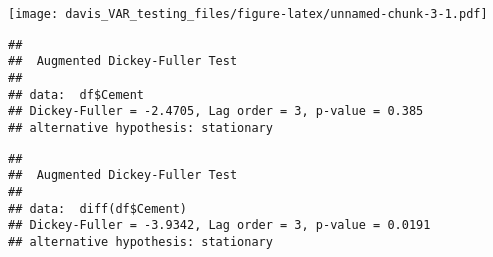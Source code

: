 \documentclass[
]{article}
\newenvironment{Shaded}{\begin{snugshade}}{\end{snugshade}}
\newcommand{\AttributeTok}[1]{\textcolor[rgb]{0.13,0.29,0.53}{#1}}
\newcommand{\CommentTok}[1]{\textcolor[rgb]{0.56,0.35,0.01}{\textit{#1}}}
\newcommand{\DecValTok}[1]{\textcolor[rgb]{0.00,0.00,0.81}{#1}}
\newcommand{\FunctionTok}[1]{\textcolor[rgb]{0.13,0.29,0.53}{\textbf{#1}}}
\newcommand{\NormalTok}[1]{#1}
\newcommand{\SpecialCharTok}[1]{\textcolor[rgb]{0.81,0.36,0.00}{\textbf{#1}}}
\begin{document}
\begin{Shaded}
\end{Shaded}

\texttt{[image: davis\_VAR\_testing\_files/figure-latex/unnamed-chunk-3-1.pdf]}

\begin{Shaded}
\end{Shaded}

\begin{verbatim}
## 
##  Augmented Dickey-Fuller Test
## 
## data:  df$Cement
## Dickey-Fuller = -2.4705, Lag order = 3, p-value = 0.385
## alternative hypothesis: stationary
\end{verbatim}

\begin{Shaded}
\end{Shaded}

\begin{verbatim}
## 
##  Augmented Dickey-Fuller Test
## 
## data:  diff(df$Cement)
## Dickey-Fuller = -3.9342, Lag order = 3, p-value = 0.0191
## alternative hypothesis: stationary
\end{verbatim}

\begin{Shaded}
\end{Shaded}
\end{document}

